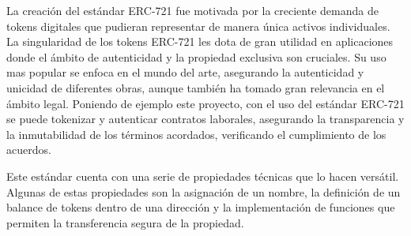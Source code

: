 La creación del estándar ERC-721 fue motivada por la creciente demanda de tokens digitales que pudieran representar de manera única activos individuales.
La singularidad de los tokens ERC-721 les dota de gran utilidad en aplicaciones donde el ámbito de autenticidad y la propiedad exclusiva son cruciales.
Su uso mas popular se enfoca en el mundo del arte, asegurando la autenticidad y unicidad de diferentes obras, aunque también ha tomado gran relevancia en el ámbito legal. 
Poniendo de ejemplo este proyecto, con el uso del estándar ERC-721 se puede tokenizar y autenticar contratos laborales, asegurando la transparencia y la inmutabilidad de los términos acordados, verificando el cumplimiento de los acuerdos.

Este estándar cuenta con una serie de propiedades técnicas que lo hacen versátil. Algunas de estas propiedades son la asignación de un nombre, la definición de un balance de tokens dentro de una dirección y la implementación de funciones que permiten la transferencia segura de la propiedad.

